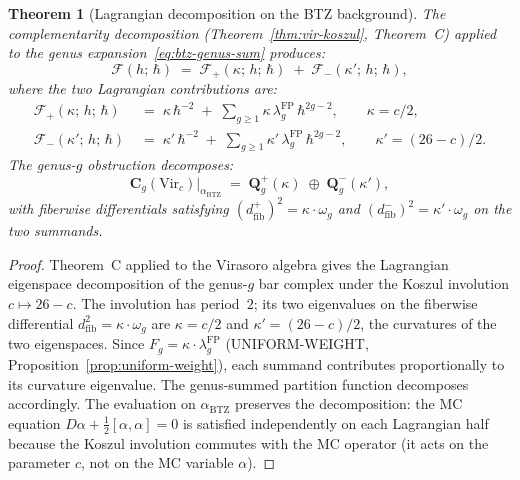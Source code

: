 \documentclass[11pt,reqno]{amsart}
\newtheorem{theorem}{Theorem}[section]
\theoremstyle{definition}
\theoremstyle{remark}
\begin{document}
\begin{theorem}[Lagrangian decomposition on the BTZ background]
\label{thm:lagrangian-btz}
The complementarity decomposition
(Theorem~\textup{\ref{thm:vir-koszul}}, Theorem~C) applied to
the genus expansion~\eqref{eq:btz-genus-sum} produces:
\begin{equation}\label{eq:lagrangian-btz}
\mathcal{F}(h;\,\hbar)
\;=\;
\mathcal{F}_+(\kappa;\,h;\,\hbar)
\;+\;
\mathcal{F}_-(\kappa';\,h;\,\hbar),
\end{equation}
where the two Lagrangian contributions are:
\begin{align}
\mathcal{F}_+(\kappa;\,h;\,\hbar)
&\;=\;
\kappa\,\hbar^{-2}
\;+\;
\sum_{g \ge 1}\kappa\,\lambda_g^{\mathrm{FP}}\,
\hbar^{2g-2},
\qquad
\kappa = c/2,
\label{eq:F-plus}\\[4pt]
\mathcal{F}_-(\kappa';\,h;\,\hbar)
&\;=\;
\kappa'\,\hbar^{-2}
\;+\;
\sum_{g \ge 1}\kappa'\,\lambda_g^{\mathrm{FP}}\,
\hbar^{2g-2},
\qquad
\kappa' = (26-c)/2.
\label{eq:F-minus}
\end{align}
The genus-$g$ obstruction decomposes:
\begin{equation}\label{eq:Cg-decomp-btz}
\mathbf{C}_g(\mathrm{Vir}_c)\big|_{\alpha_{\mathrm{BTZ}}}
\;=\;
\mathbf{Q}_g^+(\kappa)
\;\oplus\;
\mathbf{Q}_g^-(\kappa'),
\end{equation}
with fiberwise differentials satisfying
$(d_{\mathrm{fib}}^+)^2 = \kappa\cdot\omega_g$ and
$(d_{\mathrm{fib}}^-)^2 = \kappa'\cdot\omega_g$ on the two
summands.
\end{theorem}

\begin{proof}
Theorem~C applied to the Virasoro algebra gives the
Lagrangian eigenspace decomposition of the genus-$g$ bar complex
under the Koszul involution $c \mapsto 26-c$. The involution has
period~$2$; its two eigenvalues on the fiberwise differential
$d_{\mathrm{fib}}^2 = \kappa\cdot\omega_g$ are $\kappa = c/2$
and $\kappa' = (26-c)/2$, the curvatures of the two eigenspaces.
Since $F_g = \kappa\cdot\lambda_g^{\mathrm{FP}}$
(UNIFORM-WEIGHT, Proposition~\ref{prop:uniform-weight}), each
summand contributes proportionally to its curvature eigenvalue.
The genus-summed partition function decomposes accordingly. The
evaluation on $\alpha_{\mathrm{BTZ}}$ preserves the
decomposition: the MC equation
$D\alpha + \frac{1}{2}[\alpha,\alpha] = 0$ is satisfied
independently on each Lagrangian half because the Koszul
involution commutes with the MC operator (it acts on the
parameter $c$, not on the MC variable $\alpha$).
\end{proof}
\end{document}
